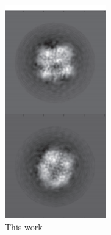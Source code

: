 \documentclass{beamer}
\begin{document}
\begin{frame}
\begin{columns}
\begin{figure}
\centering
\includegraphics[width=.8 \columnwidth]{figures/deneg_cwf.png}
\caption{This work}
\end{figure}


\end{columns}
\end{frame}
\end{document}
